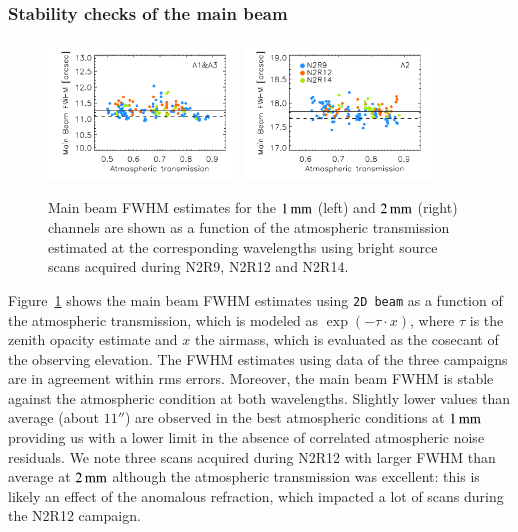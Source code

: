 \subsubsection{Stability checks of the main beam}
\label{se:mainbeam_stability}

\begin{figure}[!thbp]
\begin{center}
  \includegraphics[clip, width=0.45\textwidth]{Figures/plot_FWHM_vs_atmtrans_mb_radius_binning2_1mm.pdf}
  \includegraphics[clip, width=0.45\textwidth]{Figures/plot_FWHM_vs_atmtrans_mb_radius_binning2_a2.pdf}
  \caption[Main Beam FWHM]{Main beam FWHM estimates for the
    $1\,\rm{mm}$ (left) and $2\,\rm{mm}$ (right) channels are shown as
    a function of the atmospheric transmission estimated at the
    corresponding wavelengths using bright source scans acquired during N2R9, N2R12 and N2R14. }
\label{fig:fwhm_map_atmtrans}
\end{center}
\end{figure}

Figure~\ref{fig:fwhm_map_atmtrans} shows the main beam FWHM estimates
using {\tt 2D beam} as a function of the atmospheric transmission,
which is modeled as $\exp{\left(-\tau \cdot x\right)}$, where $\tau$
is the zenith opacity estimate and
$x$ the airmass, which is evaluated as the cosecant of the observing
elevation. The FWHM estimates using data of the three campaigns are in
agreement within rms errors. Moreover, the main beam FWHM is stable
against the atmospheric condition at both wavelengths. Slightly lower
values than average (about $11''$) are observed in the best
atmospheric conditions at $1\,\rm{mm}$ providing us with a lower limit
in the absence of correlated atmospheric noise residuals. We note
three scans acquired during N2R12 with larger FWHM than average at
$2\,\rm{mm}$ although the atmospheric transmission was excellent: this
is likely an effect of the anomalous refraction, which impacted
a lot of scans during the N2R12 campaign. 



